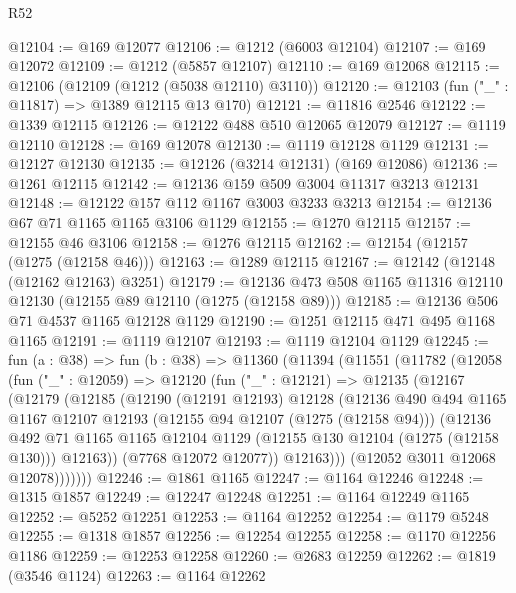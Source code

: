 \begin{lexlean}{R52}
\begin{coremodule}
@12104 := @169 @12077
@12106 := @1212 (@6003 @12104)
@12107 := @169 @12072
@12109 := @1212 (@5857 @12107)
@12110 := @169 @12068
@12115 := @12106 (@12109 (@1212 (@5038 @12110) @3110))
@12120 := @12103 (fun ("_" : @11817) => @1389 @12115 @13 @170)
@12121 := @11816 @2546
@12122 := @1339 @12115
@12126 := @12122 @488 @510 @12065 @12079
@12127 := @1119 @12110
@12128 := @169 @12078
@12130 := @1119 @12128 @1129
@12131 := @12127 @12130
@12135 := @12126 (@3214 @12131) (@169 @12086)
@12136 := @1261 @12115
@12142 := @12136 @159 @509 @3004 @11317 @3213 @12131
@12148 := @12122 @157 @112 @1167 @3003 @3233 @3213
@12154 := @12136 @67 @71 @1165 @1165 @3106 @1129
@12155 := @1270 @12115
@12157 := @12155 @46 @3106
@12158 := @1276 @12115
@12162 := @12154 (@12157 (@1275 (@12158 @46)))
@12163 := @1289 @12115
@12167 := @12142 (@12148 (@12162 @12163) @3251)
@12179 := @12136 @473 @508 @1165 @11316 @12110 @12130 (@12155 @89 @12110 (@1275 (@12158 @89)))
@12185 := @12136 @506 @71 @4537 @1165 @12128 @1129
@12190 := @1251 @12115 @471 @495 @1168 @1165
@12191 := @1119 @12107
@12193 := @1119 @12104 @1129
@12245 := fun (a : @38) =>
  fun (b : @38) =>
  @11360
    (@11394
      (@11551
        (@11782
          (@12058
            (fun ("_" : @12059) =>
            @12120
              (fun ("_" : @12121) =>
              @12135
                (@12167
                  (@12179
                    (@12185
                      (@12190
                        (@12191 @12193)
                        @12128
                        (@12136
                          @490
                          @494
                          @1165
                          @1167
                          @12107
                          @12193
                          (@12155 @94 @12107 (@1275 (@12158 @94)))
                          (@12136
                            @492
                            @71
                            @1165
                            @1165
                            @12104
                            @1129
                            (@12155 @130 @12104 (@1275 (@12158 @130)))
                            @12163))
                        (@7768 @12072 @12077))
                      @12163)))
                (@12052 @3011 @12068 @12078)))))))
@12246 := @1861 @1165
@12247 := @1164 @12246
@12248 := @1315 @1857
@12249 := @12247 @12248
@12251 := @1164 @12249 @1165
@12252 := @5252 @12251
@12253 := @1164 @12252
@12254 := @1179 @5248
@12255 := @1318 @1857
@12256 := @12254 @12255
@12258 := @1170 @12256 @1186
@12259 := @12253 @12258
@12260 := @2683 @12259
@12262 := @1819 (@3546 @1124)
@12263 := @1164 @12262

\end{coremodule}
\end{lexlean}
